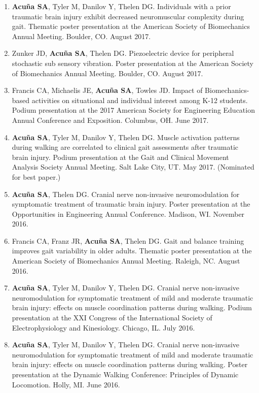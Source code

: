 \documentclass[letterpaper, 10pt]{article}
\begin{document}
\begin{enumerate}
    \item \textbf{Acuña SA}, Tyler M, Danilov Y, Thelen DG. Individuals with a prior traumatic brain injury exhibit decreased neuromuscular complexity during gait. Thematic poster presentation at the American Society of Biomechanics Annual Meeting. Boulder, CO. August 2017.
    \item Zunker JD, \textbf{Acuña SA}, Thelen DG. Piezoelectric device for peripheral stochastic sub sensory vibration. Poster presentation at the American Society of Biomechanics Annual Meeting. Boulder, CO. August 2017.
    \item Francis CA, Michaelis JE, \textbf{Acuña SA}, Towles JD. Impact of Biomechanics-based activities on situational and individual interest among K-12 students. Podium presentation at the 2017 American Society for Engineering Education Annual Conference and Exposition. Columbus, OH. June 2017.
    \item \textbf{Acuña SA}, Tyler M, Danilov Y, Thelen DG. Muscle activation patterns during walking are correlated to clinical gait assessments after traumatic brain injury. Podium presentation at the Gait and Clinical Movement Analysis Society Annual Meeting. Salt Lake City, UT. May 2017. (Nominated for best paper.)
    \item \textbf{Acuña SA}, Thelen DG. Cranial nerve non-invasive neuromodulation for symptomatic treatment of traumatic brain injury. Poster presentation at the Opportunities in Engineering Annual Conference. Madison, WI. November 2016.
    \item Francis CA, Franz JR, \textbf{Acuña SA}, Thelen DG. Gait and balance training improves gait variability in older adults. Thematic poster presentation at the American Society of Biomechanics Annual Meeting. Raleigh, NC. August 2016.
    \item \textbf{Acuña SA}, Tyler M, Danilov Y, Thelen DG. Cranial nerve non-invasive neuromodulation for symptomatic treatment of mild and moderate traumatic brain injury: effects on muscle coordination patterns during walking. Podium presentation at the XXI Congress of the International Society of Electrophysiology and Kinesiology. Chicago, IL. July 2016.
    \item \textbf{Acuña SA}, Tyler M, Danilov Y, Thelen DG. Cranial nerve non-invasive neuromodulation for symptomatic treatment of mild and moderate traumatic brain injury: effects on muscle coordination patterns during walking. Poster presentation at the Dynamic Walking Conference: Principles of Dynamic Locomotion. Holly, MI. June 2016.

\end{enumerate}
\end{document}
